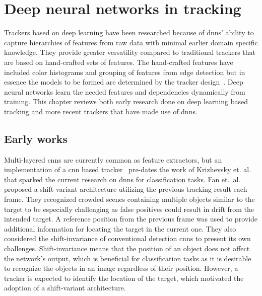 \section{Deep neural networks in tracking}\label{sec:beef}
Trackers based on deep learning have been researched because of \ac{dnn}s' ability to capture hierarchies of features from raw data with minimal earlier domain specific knowledge. They provide greater versatility compared to traditional trackers that are based on hand-crafted sets of features. The hand-crafted features have included color histograms and grouping of features from edge detection but in essence the models to be formed are determined by the tracker design~\cite{MEAN_SHIFT}. Deep neural networks learn the needed features and dependencies dynamically from training. This chapter reviews both early research done on deep learning based tracking and more recent trackers that have made use of \ac{dnn}s.

\subsection{Early works}\label{ssec:early}
Multi-layered \ac{cnn}s are currently common as feature extractors, but an implementation of a \ac{cnn} based tracker~\cite{HUMAN_CNN} pre-dates the work of Krizhevsky et. al.~\cite{NIPS_IMAGENET} that sparked the current research on \ac{dnn}s for classification tasks. Fan et.~al.~\cite{HUMAN_CNN} proposed a shift-variant architecture utilizing the previous tracking result each frame. They recognized crowded scenes containing multiple objects similar to the target to be especially challenging as false positives could result in drift from the intended target. A reference position from the previous frame was used to provide additional information for locating the target in the current one. They also considered the shift-invariance of conventional detection \ac{cnn}s to present its own challenges. Shift-invariance means that the position of an object does not affect the network's output, which is beneficial for classification tasks as it is desirable to recognize the objects in an image regardless of their position. However, a tracker is expected to identify the location of the target, which motivated the adoption of a shift-variant architecture.~\cite{HUMAN_CNN}

